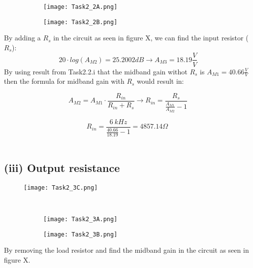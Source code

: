 	\begin{figure}[h]
        \centering
        \begin{subfigure}[h]{0.7\textwidth}
                \texttt{[image: Task2\_2A.png]}
                \label{fig:}
        \end{subfigure}
        \begin{subfigure}[h]{0.25\textwidth}
                \texttt{[image: Task2\_2B.png]}
                \label{fig:}
        \end{subfigure}
	\end{figure}

	By adding a $R_{s}$ in the circuit as seen in figure X,  we can find the input resistor ($R_{s}$):
	$$ 20 \cdot log(A_{M2}) = 25.2002 dB  \rightarrow A_{M3} = 18.19 \frac{V}{V} $$
	By using result from Task2.2.i that the midband gain withot $R_{s}$ is $A_{M1} = 40.66 \frac{V}{V}$ then the formula for midband gain with $R_{s}$ would result in:

	$$ A_{M2} = A_{M1} \cdot \frac{R_{in}}{R_{in} + R_{s}} \rightarrow R_{in} = \frac{R_{s}}{\frac{A_{M1}}{A_{M2}}-1} $$
	
	$$R_{in} = \frac{6\ kHz}{\frac{40.66}{18.19}-1} = 4857.14 \Omega \ $$ \\

 	\subsection*{(iii) Output resistance}

	\begin{figure}[h!]
	    \centering
	    \texttt{[image: Task2\_3C.png]}
	\end{figure}  \

	\begin{figure}[h]
	    \centering
	    \begin{subfigure}[h]{0.7\textwidth}
	            \texttt{[image: Task2\_3A.png]}
	            \label{fig:}
	    \end{subfigure}
	    \begin{subfigure}[h]{0.25\textwidth}
	            \texttt{[image: Task2\_3B.png]}
	            \label{fig:}
	    \end{subfigure}
	\end{figure}

		By removing the load resistor and find the midband gain in the circuit as seen in figure X.

